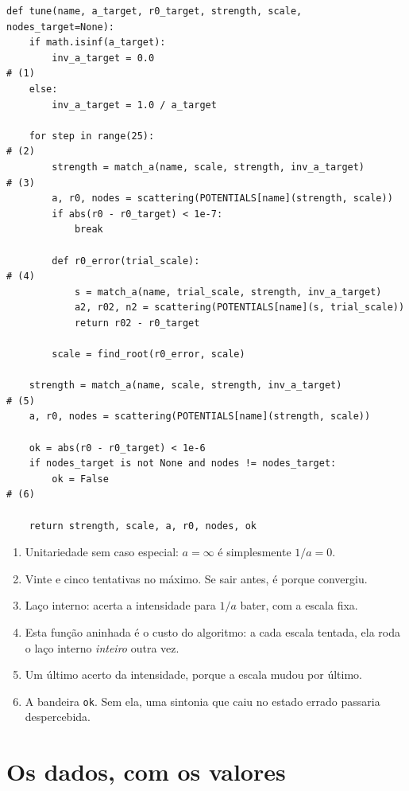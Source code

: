 \documentclass[11pt,a4paper]{article}
\begin{document}
\begin{lstlisting}
def tune(name, a_target, r0_target, strength, scale, nodes_target=None):
    if math.isinf(a_target):
        inv_a_target = 0.0                                            # (1)
    else:
        inv_a_target = 1.0 / a_target

    for step in range(25):                                            # (2)
        strength = match_a(name, scale, strength, inv_a_target)       # (3)
        a, r0, nodes = scattering(POTENTIALS[name](strength, scale))
        if abs(r0 - r0_target) < 1e-7:
            break

        def r0_error(trial_scale):                                    # (4)
            s = match_a(name, trial_scale, strength, inv_a_target)
            a2, r02, n2 = scattering(POTENTIALS[name](s, trial_scale))
            return r02 - r0_target

        scale = find_root(r0_error, scale)

    strength = match_a(name, scale, strength, inv_a_target)           # (5)
    a, r0, nodes = scattering(POTENTIALS[name](strength, scale))

    ok = abs(r0 - r0_target) < 1e-6
    if nodes_target is not None and nodes != nodes_target:
        ok = False                                                    # (6)

    return strength, scale, a, r0, nodes, ok
\end{lstlisting}

\begin{enumerate}\setlength\itemsep{1pt}
\item Unitariedade sem caso especial: $a=\infty$ é simplesmente $1/a=0$.
\item Vinte e cinco tentativas no máximo. Se sair antes, é porque convergiu.
\item Laço interno: acerta a intensidade para $1/a$ bater, com a escala fixa.
\item Esta função aninhada é o custo do algoritmo: a cada escala tentada, ela
      roda o laço interno \emph{inteiro} outra vez.
\item Um último acerto da intensidade, porque a escala mudou por último.
\item A bandeira \texttt{ok}. Sem ela, uma sintonia que caiu no estado errado
      passaria despercebida.
\end{enumerate}

\section{Os dados, com os valores}
\end{document}
